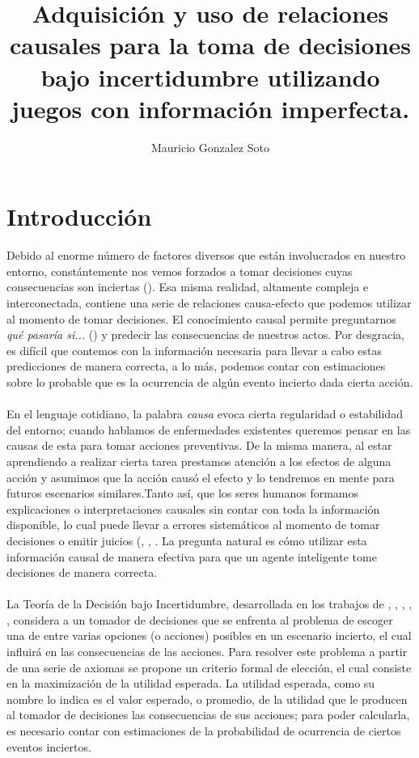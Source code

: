 \documentclass[11pt]{article}
\title{Adquisición y uso de relaciones causales para la toma de decisiones bajo incertidumbre utilizando juegos con información imperfecta.}
\author{Mauricio Gonzalez Soto}
\theoremstyle{plain}
\begin{document}
\maketitle
\section{Introducción}
Debido al enorme número de factores diversos que están involucrados en nuestro entorno, constántemente nos vemos forzados a tomar decisiones cuyas consecuencias son inciertas (\cite{danks2014unifying}). Esa misma realidad, altamente compleja e interconectada, contiene una serie de relaciones causa-efecto que podemos utilizar al momento de tomar decisiones. El conocimiento causal permite preguntarnos  \textit{qué pasaría si...} (\cite{stalnaker2016knowledge}) y predecir las consecuencias de nuestros actos. Por desgracia, es difícil que contemos con la información necesaria para llevar a cabo estas predicciones de manera correcta, a lo más, podemos contar con estimaciones sobre lo probable que es la ocurrencia de algún evento incierto dada cierta acción.\\
\\
\indent En el lenguaje cotidiano, la palabra \textit{causa} evoca cierta regularidad o estabilidad del entorno; cuando hablamos de enfermedades existentes queremos pensar en las causas de esta para tomar acciones preventivas. De la misma manera, al estar aprendiendo a realizar cierta tarea prestamos atención a los efectos de alguna acción y asumimos que la acción causó el efecto y lo tendremos en mente para futuros escenarios similares.Tanto así, que los seres humanos formamos explicaciones o interpretaciones causales sin contar con toda la información disponible, lo cual puede llevar a errores sistemáticos al momento de tomar decisiones o emitir juicios (\cite{tversky1977causal}, \cite{tversky1980causal}, \cite{kahneman2011thinking}. La pregunta natural es cómo utilizar esta información causal de manera efectiva para que un agente inteligente tome decisiones de manera correcta.\\
\\
\indent La Teoría de la Decisión bajo Incertidumbre, desarrollada en los trabajos de \cite{von1944theory}, \cite{definetti1930}, \cite{definetti1937}, \cite{savage1954the}, \cite{bernardo2000bayesian}, considera a un tomador de decisiones que se enfrenta al problema de escoger una de entre varias opciones (o acciones) posibles en un escenario incierto, el cual influirá en las consecuencias de las acciones. Para resolver este problema a partir de una serie de axiomas se propone un criterio formal de elección, el cual consiste en la maximización de la utilidad esperada. La utilidad esperada, como su nombre lo indica es el valor esperado, o promedio, de la utilidad que le producen al tomador de decisiones las consecuencias de sus acciones; para poder calcularla, es necesario contar con estimaciones de la probabilidad de ocurrencia de ciertos eventos inciertos. \\
\end{document}
